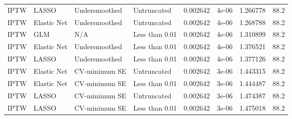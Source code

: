 \begin{longtable}[l]{llllllll}
IPTW & LASSO & Undersmoothed & Untruncated & 0.002642 & 4e-06 & 1.266778 & 88.2\\
IPTW & Elastic Net & Undersmoothed & Untruncated & 0.002642 & 4e-06 & 1.268788 & 88.2\\
IPTW & GLM & N/A & Less than 0.01 & 0.002642 & 4e-06 & 1.310899 & 88.2\\
IPTW & Elastic Net & Undersmoothed & Less than 0.01 & 0.002642 & 4e-06 & 1.376521 & 88.2\\
IPTW & LASSO & Undersmoothed & Less than 0.01 & 0.002642 & 4e-06 & 1.377126 & 88.2\\
IPTW & Elastic Net & CV-minimum SE & Untruncated & 0.002642 & 3e-06 & 1.443315 & 88.2\\
IPTW & Elastic Net & CV-minimum SE & Less than 0.01 & 0.002642 & 3e-06 & 1.444487 & 88.2\\
IPTW & LASSO & CV-minimum SE & Untruncated & 0.002642 & 3e-06 & 1.474387 & 88.2\\
IPTW & LASSO & CV-minimum SE & Less than 0.01 & 0.002642 & 3e-06 & 1.475018 & 88.2\\
\bottomrule
\end{longtable}
